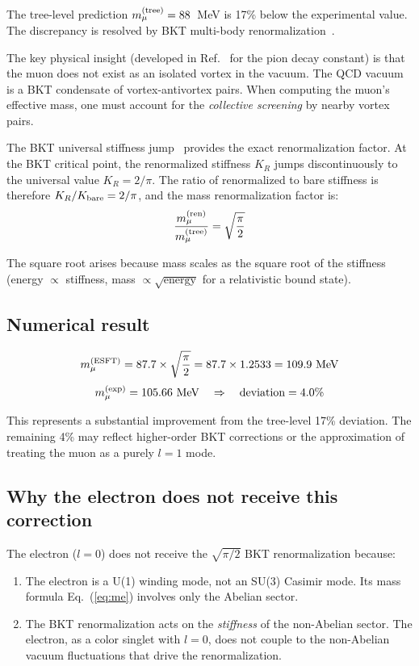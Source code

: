 ﻿\documentclass[twocolumn,preprintnumbers,amsmath,amssymb]{revtex4-2}
\begin{document}
The tree-level prediction $m_\mu^{(\rm tree)} = 88$~MeV is 17\% below the experimental value. The discrepancy is resolved by BKT multi-body renormalization~\cite{KT1973,NK1977}.

The key physical insight (developed in Ref.~\cite{Paper5} for the pion decay constant) is that the muon does not exist as an isolated vortex in the vacuum. The QCD vacuum is a BKT condensate of vortex-antivortex pairs. When computing the muon's effective mass, one must account for the \emph{collective screening} by nearby vortex pairs.

The BKT universal stiffness jump~\cite{NK1977} provides the exact renormalization factor. At the BKT critical point, the renormalized stiffness $K_R$ jumps discontinuously to the universal value $K_R = 2/\pi$. The ratio of renormalized to bare stiffness is therefore $K_R/K_{\rm bare} = 2/\pi$, and the mass renormalization factor is:
\begin{equation}
\frac{m_\mu^{(\rm ren)}}{m_\mu^{(\rm tree)}} = \sqrt{\frac{\pi}{2}}
\label{eq:bkt_renorm}
\end{equation}

The square root arises because mass scales as the square root of the stiffness (energy $\propto$ stiffness, mass $\propto \sqrt{\text{energy}}$ for a relativistic bound state).

\subsection{Numerical result}

\begin{equation}
m_\mu^{(\rm ESFT)} = 87.7 \times \sqrt{\frac{\pi}{2}} = 87.7 \times 1.2533 = 109.9~\text{MeV}
\end{equation}
\begin{equation}
m_\mu^{(\rm exp)} = 105.66~\text{MeV} \quad \Rightarrow \quad \text{deviation} = 4.0\%
\end{equation}

This represents a substantial improvement from the tree-level 17\% deviation. The remaining 4\% may reflect higher-order BKT corrections or the approximation of treating the muon as a purely $l = 1$ mode.

\subsection{Why the electron does not receive this correction}

The electron ($l = 0$) does not receive the $\sqrt{\pi/2}$ BKT renormalization because:
\begin{enumerate}
\item The electron is a U(1) winding mode, not an SU(3) Casimir mode. Its mass formula Eq.~(\ref{eq:me}) involves only the Abelian sector.
\item The BKT renormalization acts on the \emph{stiffness} of the non-Abelian sector. The electron, as a color singlet with $l = 0$, does not couple to the non-Abelian vacuum fluctuations that drive the renormalization.
\end{enumerate}
\end{document}
